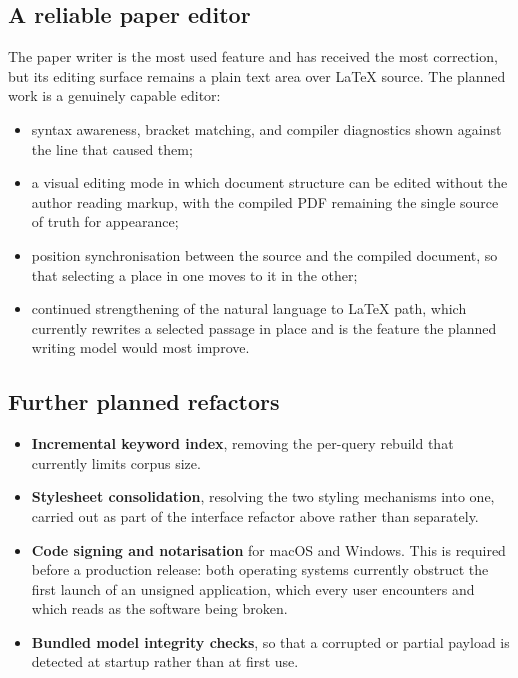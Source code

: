 \documentclass[11pt,a4paper]{article}
\begin{document}
\subsection{A reliable paper editor}

The paper writer is the most used feature and has received the most correction,
but its editing surface remains a plain text area over LaTeX source. The planned
work is a genuinely capable editor:

\begin{itemize}[leftmargin=*]
  \item syntax awareness, bracket matching, and compiler diagnostics shown
        against the line that caused them;
  \item a visual editing mode in which document structure can be edited without
        the author reading markup, with the compiled PDF remaining the single
        source of truth for appearance;
  \item position synchronisation between the source and the compiled document,
        so that selecting a place in one moves to it in the other;
  \item continued strengthening of the natural language to LaTeX path, which
        currently rewrites a selected passage in place and is the feature the
        planned writing model would most improve.
\end{itemize}

\subsection{Further planned refactors}

\begin{itemize}[leftmargin=*]
  \item \textbf{Incremental keyword index}, removing the per-query rebuild that
        currently limits corpus size.
  \item \textbf{Stylesheet consolidation}, resolving the two styling mechanisms
        into one, carried out as part of the interface refactor above rather
        than separately.
  \item \textbf{Code signing and notarisation} for macOS and Windows. This is
        required before a production release: both operating systems currently
        obstruct the first launch of an unsigned application, which every user
        encounters and which reads as the software being broken.
  \item \textbf{Bundled model integrity checks}, so that a corrupted or partial
        payload is detected at startup rather than at first use.
\end{itemize}
\end{document}
